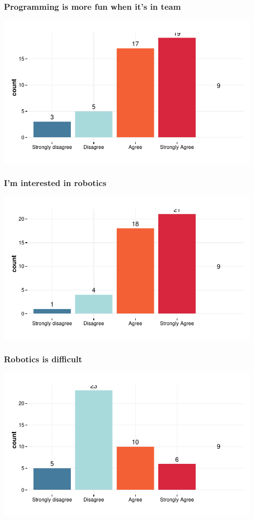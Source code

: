\documentclass{article}
\begin{document}
\subsubsection{Programming is more fun when it’s in team}
\includegraphics{Raw_num/plots/-plot_prog_fun_team}

\subsubsection{I’m interested in robotics}
\includegraphics{Raw_num/plots/-plot_robotik_interet}

\subsubsection{Robotics is difficult}
\includegraphics{Raw_num/plots/-plot_hard_robotik}
\end{document}
